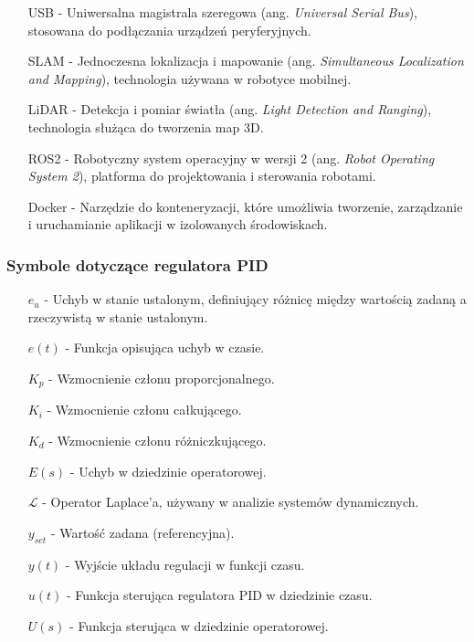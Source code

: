 \begin{itemize}
    \item[USB] - Uniwersalna magistrala szeregowa (ang. \textit{Universal Serial Bus}), stosowana do podłączania urządzeń peryferyjnych.
    \item[SLAM] - Jednoczesna lokalizacja i mapowanie (ang. \textit{Simultaneous Localization and Mapping}), technologia używana w robotyce mobilnej.
    \item[LiDAR] - Detekcja i pomiar światła (ang. \textit{Light Detection and Ranging}), technologia służąca do tworzenia map 3D.
    \item[ROS2] - Robotyczny system operacyjny w wersji 2 (ang. \textit{Robot Operating System 2}), platforma do projektowania i sterowania robotami.
    \item[Docker] - Narzędzie do konteneryzacji, które umożliwia tworzenie, zarządzanie i uruchamianie aplikacji w izolowanych środowiskach.
\end{itemize}

\subsubsection*{Symbole dotyczące regulatora PID}

\begin{itemize}
    \item[\(e_u\)] - Uchyb w stanie ustalonym, definiujący różnicę między wartością zadaną a rzeczywistą w stanie ustalonym.
    \item[\(e(t)\)] - Funkcja opisująca uchyb w czasie.
    \item[\(K_p\)] - Wzmocnienie członu proporcjonalnego.
    \item[\(K_i\)] - Wzmocnienie członu całkującego.
    \item[\(K_d\)] - Wzmocnienie członu różniczkującego.
    \item[\(E(s)\)] - Uchyb w dziedzinie operatorowej.
    \item[\(\mathcal{L}\)] - Operator Laplace’a, używany w analizie systemów dynamicznych.
    \item[\(y_{set}\)] - Wartość zadana (referencyjna).
    \item[\(y(t)\)] - Wyjście układu regulacji w funkcji czasu.
    \item[\(u(t)\)] - Funkcja sterująca regulatora PID w dziedzinie czasu.
    \item[\(U(s)\)] - Funkcja sterująca w dziedzinie operatorowej.
\end{itemize}

